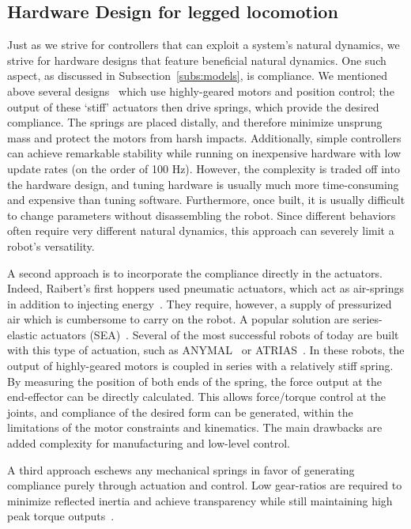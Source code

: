 \subsection{Hardware Design for legged locomotion}

Just as we strive for controllers that can exploit a system's natural dynamics, we strive for hardware designs that feature beneficial natural dynamics.
One such aspect, as discussed in Subsection~\ref{subs:models}, is compliance.
We mentioned above several designs~\cite{sprowitz2013towards,buchli2006resonance,altendorfer2001rhex,owaki2013simple} which use highly-geared motors and position control; the output of these `stiff' actuators then drive springs, which provide the desired compliance. The springs are placed distally, and therefore minimize unsprung mass and protect the motors from harsh impacts. Additionally, simple controllers can achieve remarkable stability while running on inexpensive hardware with low update rates (on the order of 100 Hz). However, the complexity is traded off into the hardware design, and tuning hardware is usually much more time-consuming and expensive than tuning software. Furthermore, once built, it is usually difficult to change parameters without disassembling the robot. Since different behaviors often require very different natural dynamics, this approach can severely limit a robot's versatility. \par
A second approach is to incorporate the compliance directly in the actuators. Indeed, Raibert's first hoppers used pneumatic actuators, which act as air-springs in addition to injecting energy~\cite{raibert1986legged}. They require, however, a supply of pressurized air which is cumbersome to carry on the robot. %
A popular solution are series-elastic actuators (SEA)~\cite{pratt1995series}.
Several of the most successful robots of today are built with this type of actuation, such as ANYMAL~\cite{hutter2016anymal} or ATRIAS~\cite{hubicki2016atrias}.
In these robots, the output of highly-geared motors is coupled in series with a relatively stiff spring. By measuring the position of both ends of the spring, the force output at the end-effector can be directly calculated. This allows force/torque control at the joints, and compliance of the desired form can be generated, within the limitations of the motor constraints and kinematics. The main drawbacks are added complexity for manufacturing and low-level control.
\par
A third approach eschews any mechanical springs in favor of generating compliance purely through actuation and control. Low gear-ratios are required to minimize reflected inertia and achieve transparency while still maintaining high peak torque outputs~\cite{Seok2012proprioceptive}.
